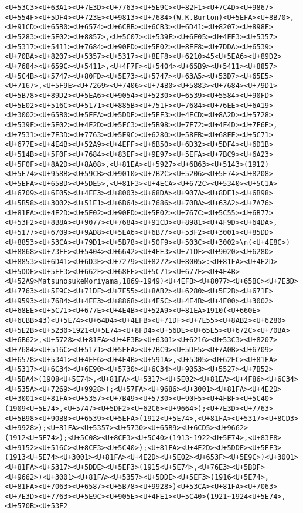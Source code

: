 \documentclass[
]{article}
\begin{document}
\begin{verbatim}
<U+53C3><U+63A1><U+7E3D><U+7763><U+5E9C><U+82F1><U+7C4D><U+9867><U+554F><U+5DF4><U+723E><U+9813><U+7684>(W.K.Burton)<U+5EFA><U+8B70>,<U+91CD><U+65B0><U+6574><U+6CBB><U+6CB3><U+6D41><U+8207><U+898F><U+5283><U+5E02><U+8857>,<U+5C07><U+539F><U+6E05><U+4EE3><U+5357><U+5317><U+5411><U+7684><U+90FD><U+5E02><U+8EF8><U+7DDA><U+6539><U+70BA><U+8207><U+5357><U+5317><U+8EF8><U+6210>45<U+5EA6><U+89D2><U+7684><U+659C><U+5411>,<U+4F7F><U+5404><U+65B9><U+5411><U+8857><U+5C4B><U+5747><U+80FD><U+5E73><U+5747><U+63A5><U+53D7><U+65E5><U+7167>,<U+5F9E><U+7269><U+7406><U+74B0><U+5883><U+7684><U+79D1><U+5B78><U+89D2><U+5EA6><U+9054><U+5230><U+6539><U+5584><U+90FD><U+5E02><U+516C><U+5171><U+885B><U+751F><U+7684><U+76EE><U+6A19><U+3002><U+65B0><U+5EFA><U+5DDE><U+5EF3><U+4ECD><U+8A2D><U+5728><U+539F><U+5E02><U+4E2D><U+5FC3><U+5B98><U+7F72><U+4F4D><U+7F6E>,<U+7531><U+7E3D><U+7763><U+5E9C><U+6280><U+58EB><U+68EE><U+5C71><U+677E><U+4E4B><U+52A9><U+4EFF><U+6B50><U+6D32><U+5DF4><U+6D1B><U+514B><U+5F0F><U+7684><U+83EF><U+9E97><U+5EFA><U+7BC9><U+6A23><U+5F0F><U+8A2D><U+8A08>,<U+81EA><U+5927><U+6B63><U+5143>(1912)<U+5E74><U+958B><U+59CB><U+9010><U+7B2C><U+5206><U+5E74><U+8208><U+5EFA><U+65BD><U+5DE5>,<U+81F3><U+4ECA><U+672C><U+5340><U+5C1A><U+6709><U+6E05><U+4EE3><U+8003><U+68DA><U+907A><U+8DE1><U+6B98><U+5B58><U+3002><U+51E1><U+6B64><U+7686><U+70BA><U+63A2><U+7A76><U+81FA><U+4E2D><U+5E02><U+90FD><U+5E02><U+767C><U+5C55><U+6B77><U+53F2><U+8B8A><U+9077><U+7684><U+91CD><U+8981><U+4F9D><U+64DA>,<U+5177><U+6709><U+9AD8><U+5EA6><U+6B77><U+53F2><U+3001><U+85DD><U+8853><U+53CA><U+79D1><U+5B78><U+50F9><U+503C><U+3002>\n(<U+4E8C>)<U+8868><U+73FE><U+5404><U+6642><U+4EE3><U+71DF><U+9020><U+6280><U+8853><U+6D41><U+6D3E><U+7279><U+8272><U+8005>:<U+81FA><U+4E2D><U+5DDE><U+5EF3><U+662F><U+68EE><U+5C71><U+677E><U+4E4B><U+52A9>MatsunosukeMoriyama,1869~1949)<U+4EFB><U+8077><U+65BC><U+7E3D><U+7763><U+5E9C><U+71DF><U+7E55><U+8AB2><U+6280><U+5E2B><U+671F><U+9593><U+7684><U+4EE3><U+8868><U+4F5C><U+4E4B><U+4E00><U+3002><U+68EE><U+5C71><U+677E><U+4E4B><U+52A9><U+81EA>1910(<U+660E><U+6CBB>43)<U+5E74><U+64D4><U+4EFB><U+71DF><U+7E55><U+8AB2><U+6280><U+5E2B><U+5230>1921<U+5E74><U+8FD4><U+56DE><U+65E5><U+672C><U+70BA><U+6B62>,<U+5728><U+81FA><U+4E3B><U+6301><U+6216><U+53C3><U+8207><U+7684><U+516C><U+5171><U+5EFA><U+7BC9><U+5DE5><U+7A0B><U+6709><U+6578><U+5341><U+4EF6><U+4E4B><U+591A>,<U+5305><U+62EC><U+81FA><U+5317><U+6C34><U+6E90><U+5730><U+6C34><U+9053><U+5527><U+7B52><U+5BA4>(1908<U+5E74>,<U+81FA><U+5317><U+5E02><U+81EA><U+4F86><U+6C34><U+535A><U+7269><U+9928>);<U+57FA><U+9686><U+3001><U+81FA><U+4E2D><U+3001><U+81FA><U+5357><U+7B49><U+5730><U+90F5><U+4FBF><U+5C40>(1909<U+5E74>,<U+5747><U+5DF2><U+62C6><U+9664>);<U+7E3D><U+7763><U+5B98><U+90B8><U+6539><U+5EFA>(1912<U+5E74>,<U+81FA><U+5317><U+8CD3><U+9928>);<U+81FA><U+5357><U+5730><U+65B9><U+6CD5><U+9662>(1912<U+5E74>);<U+5C08><U+8CE3><U+5C40>(1913~1922<U+5E74>,<U+83F8><U+9152><U+516C><U+8CE3><U+5C40>);<U+81FA><U+4E2D><U+5DDE><U+5EF3>(1913<U+5E74><U+3001><U+81FA><U+4E2D><U+5E02><U+653F><U+5E9C>)<U+3001><U+81FA><U+5317><U+5DDE><U+5EF3>(1915<U+5E74>,<U+76E3><U+5BDF><U+9662>)<U+3001><U+81FA><U+5357><U+5DDE><U+5EF3>(1916<U+5E74>,<U+81FA><U+7063><U+6587><U+5B78><U+9928>)<U+53CA><U+81FA><U+7063><U+7E3D><U+7763><U+5E9C><U+905E><U+4FE1><U+5C40>(1921~1924<U+5E74>,<U+570B><U+53F2
\end{verbatim}
\end{document}
